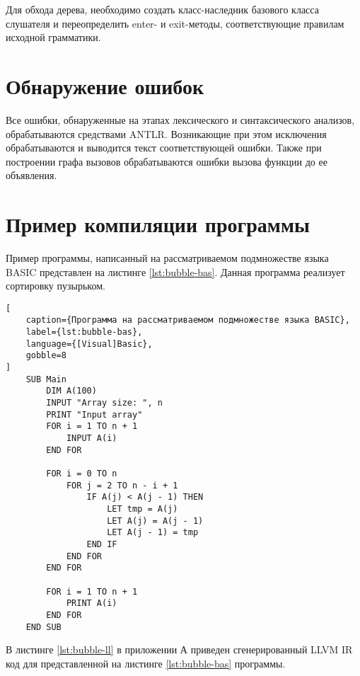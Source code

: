 Для обхода дерева, необходимо создать класс-наследник базового класса слушателя и переопределить enter- и exit-методы, соответствующие правилам исходной грамматики.

\section{Обнаружение ошибок}

Все ошибки, обнаруженные на этапах лексического и синтаксического анализов, обрабатываются средствами ANTLR.
Возникающие при этом исключения обрабатываются и выводится текст соответствующей ошибки.
Также при построении графа вызовов обрабатываются ошибки вызова функции до ее объявления.

\section{Пример компиляции программы}

Пример программы, написанный на рассматриваемом подмножестве языка BASIC представлен на листинге \ref{lst:bubble-bas}.
Данная программа реализует сортировку пузырьком.

\begin{lstlisting}[
	caption={Программа на рассматриваемом подмножестве языка BASIC},
	label={lst:bubble-bas},
	language={[Visual]Basic},
	gobble=8
]
	SUB Main
		DIM A(100)
		INPUT "Array size: ", n
		PRINT "Input array"
		FOR i = 1 TO n + 1
			INPUT A(i)
		END FOR

		FOR i = 0 TO n
			FOR j = 2 TO n - i + 1
				IF A(j) < A(j - 1) THEN
					LET tmp = A(j)
					LET A(j) = A(j - 1)
					LET A(j - 1) = tmp
				END IF
			END FOR
		END FOR

		FOR i = 1 TO n + 1
			PRINT A(i)
		END FOR
	END SUB
\end{lstlisting}


В листинге \ref{lst:bubble-ll} в приложении А приведен сгенерированный LLVM IR код для представленной на листинге \ref{lst:bubble-bas} программы.


